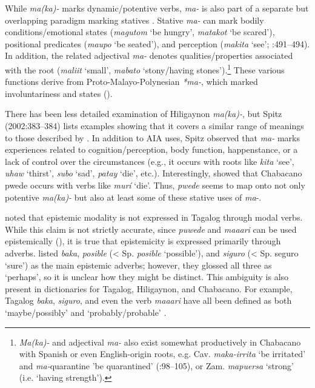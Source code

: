 While \textit{ma(ka)-} marks dynamic/potentive verbs, \textit{ma-} is also part of a separate but overlapping paradigm marking statives \citep{Himmelmann2006}. Stative \textit{ma-} can mark bodily conditions/emotional states (\textit{magutom} ‘be hungry’, \textit{matakot} ‘be scared’), positional predicates (\textit{maupo} ‘be seated’), and perception (\textit{makita} ‘see’; \citealt{Himmelmann2006}:491–494). In addition, the related adjectival \textit{ma-} denotes qualities/properties associated with the root (\textit{maliit} ‘small’, \textit{mabato} ‘stony/having stones’).\footnote{\textit{Ma(ka)-} and adjectival \textit{ma-} also exist somewhat productively in Chabacano with Spanish or even English-origin roots, e.g. Cav. \textit{maka-irrita} ‘be irritated’ and \textit{ma-}quarantine 'be quarantined' (\citealt{Escalante2010}:98–105), or Zam. \textit{mapuersa} ‘strong’ (i.e. ‘having strength’).}  These various functions derive from Proto-Malayo-Polynesian \textit{*ma-}, which marked involuntariness and states (\citealt{EvansRoss2001}).

There has been less detailed examination of Hiligaynon \textit{ma(ka)-}, but Spitz (2002:383–384) lists examples showing that it covers a similar range of meanings to those described by \citet{Himmelmann2006}. In addition to AIA uses, Spitz observed that \textit{ma-} marks experiences related to cognition/perception, body function, happenstance, or a lack of control over the circumstances (e.g., it occurs with roots like \textit{kita} ‘see’, \textit{uhaw} ‘thirst’, \textit{subo} ‘sad’, \textit{patay} ‘die’, etc.). Interestingly, \citet[292]{Rubino2008} showed that Chabacano pwede occurs with verbs like \textit{murí} ‘die’. Thus, \textit{pwede} seems to map onto not only potentive \textit{ma(ka)-} but also at least some of these stative uses of \textit{ma}{}-.

\citet{AsarinaHolt2005} noted that epistemic modality is not expressed in Tagalog through modal verbs. While this claim is not strictly accurate, since \textit{puwede} and \textit{maaari} can be used epistemically (\citealt{SchachterOtanes1972}), it is true that epistemicity is expressed primarily through adverbs. \citet{BaderEtAl1994} listed \textit{baka}, \textit{posible} (< Sp. \textit{posible} ‘possible’), and \textit{siguro} (< Sp. seguro ‘sure’) as the main epistemic adverbs; however, they glossed all three as ‘perhaps’, so it is unclear how they might be distinct. This ambiguity is also present in dictionaries for Tagalog, Hiligaynon, and Chabacano. For example, Tagalog \textit{baka}, \textit{siguro}, and even the verb \textit{maaari} have all been defined as both ‘maybe/possibly’ and ‘probably/probable’ \citep[785]{English2008}.

